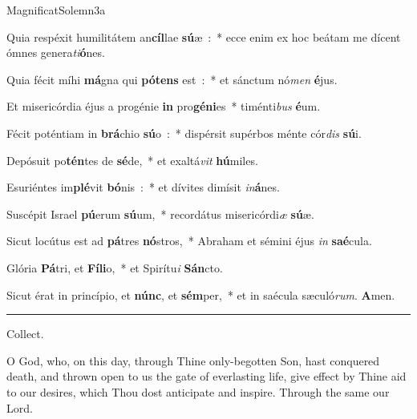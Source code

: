 \documentclass[letterpaper,12pt]{article} %
\begin{document}
{\greblockcustos{}
\begin{magnificat}{MagnificatSolemn3a}
\normalsize
\item \vspace{-3ex}Quia respéxit humilitátem an\textbf{cíl}lae \textbf{sú}æ~:~* ecce enim ex hoc beátam me dícent ómnes genera\emph{ti}\textbf{ó}nes.
\item Quia fécit míhi \textbf{má}gna qui \textbf{pó}\textbf{tens} est~:~* et sánctum nó\emph{men} \textbf{é}jus.
\item Et misericórdia éjus a progénie \textbf{in} pro\textbf{gé}\textbf{ni}es~* timénti\emph{bus} \textbf{é}um.
\item Fécit poténtiam in \textbf{brá}chio \textbf{sú}o~:~* dispérsit supérbos ménte cór\emph{dis} \textbf{sú}i.
\item Depósuit po\textbf{tén}tes de \textbf{sé}de,~* et exaltá\emph{vit} \textbf{hú}miles.
\item Esuriéntes im\textbf{plé}vit \textbf{bó}nis~:~* et dívites dimísit \emph{in}\textbf{á}nes.
\item Suscépit Israel \textbf{pú}erum \textbf{sú}um,~* recordátus misericórdi\emph{æ} \textbf{sú}æ.
\item Sicut locútus est ad \textbf{pá}tres \textbf{nó}stros,~* Abraham et sémini éjus \emph{in} \textbf{saé}cula.
\item Glória \textbf{Pá}tri, et \textbf{Fí}\textbf{li}o,~* et Spirítu\emph{i} \textbf{Sán}cto.
\item Sicut érat in princípio, et \textbf{núnc}, et \textbf{sém}per,~* et in saécula sæculó\emph{rum}. \textbf{A}men.\end{magnificat}
}
\hrule
\smallskip
\begin{center}{\large Collect.}\end{center}
\begin{parcolumns}[rulebetween]{2}
\sloppy
{}
{O God, who, on this day, through Thine only-begotten Son, hast conquered death, and thrown open to us the gate of everlasting life, give effect by Thine aid to our desires, which Thou dost anticipate and inspire. Through the same our Lord.}
\end{parcolumns}
\bigskip

\gresetfirstlineaboveinitial{\small \Vbar{}}{\small \Vbar{}}

\bigskip
\begin{parcolumns}[rulebetween]{2}
%
%
%
\colplacechunks{}
\end{parcolumns}
\end{document}
